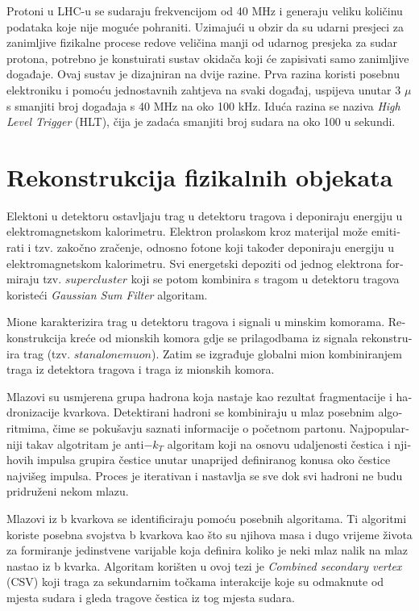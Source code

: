 \begin{otherlanguage}{croatian}
\par Protoni u LHC-u se sudaraju frekvencijom od 40 MHz i generaju veliku količinu podataka koje nije moguće pohraniti. Uzimajući u obzir da su udarni presjeci za zanimljive fizikalne procese redove veličina manji od udarnog presjeka za sudar protona, potrebno je konstuirati sustav okidača koji će zapisivati samo zanimljive događaje. Ovaj sustav je dizajniran na dvije razine. Prva razina koristi posebnu elektroniku i pomoću jednostavnih zahtjeva na svaki događaj, uspijeva unutar 3 $\mu$s smanjiti broj događaja s 40 MHz na oko 100 kHz. Iduća razina se naziva \textit{High Level Trigger} (HLT), čija je zadaća smanjiti broj sudara na oko 100 u sekundi.       

\section{Rekonstrukcija fizikalnih objekata}
\par Elektoni u detektoru ostavljaju trag u detektoru tragova i deponiraju energiju u elektromagnetskom kalorimetru. Elektron prolaskom kroz materijal može emitirati i tzv. zakočno zračenje, odnosno fotone koji također deponiraju energiju u elektromagnetskom kalorimetru. Svi energetski depoziti od jednog elektrona formiraju tzv. $supercluster$ koji se potom kombinira s tragom u detektoru tragova koristeći \textit{Gaussian Sum Filter} algoritam.
\par Mione karakterizira trag u detektoru tragova i signali u minskim komorama. Rekonstrukcija kreće od mionskih komora gdje se prilagodbama iz signala rekonstruira trag (tzv. $stanalone muon$). Zatim se izgrađuje globalni mion kombiniranjem traga iz detektora tragova i traga iz mionskih komora.   
\par Mlazovi su usmjerena grupa hadrona koja nastaje kao rezultat fragmentacije i hadronizacije kvarkova. Detektirani hadroni se kombiniraju u mlaz posebnim algoritmima, čime se pokušavju saznati informacije o početnom partonu. Najpopularniji takav algotritam je anti$-k_T$ algoritam koji na osnovu udaljenosti čestica i njihovih impulsa grupira čestice unutar unaprijed definiranog konusa oko čestice najvišeg impulsa. Proces je iterativan i nastavlja se sve dok svi hadroni ne budu pridruženi nekom mlazu.
\par Mlazovi iz b kvarkova se identificiraju pomoću posebnih algoritama. Ti algoritmi koriste posebna svojstva b kvarkova kao što su njihova masa i dugo vrijeme života za formiranje jedinstvene varijable koja definira koliko je neki mlaz nalik na mlaz nastao iz b kvarka. Algoritam korišten u ovoj tezi je \textit{Combined secondary vertex} (CSV) koji traga za sekundarnim točkama interakcije koje su odmaknute od mjesta sudara i gleda tragove čestica iz tog mjesta sudara.

\end{otherlanguage}
